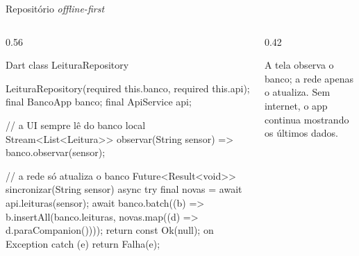 \documentclass[aspectratio=169,10pt]{beamer}
\begin{document}
\begin{frame}[fragile]{Repositório \emph{offline-first}}
  \begin{columns}[T]
    \begin{column}{0.56\textwidth}
\begin{codigo}[title=data/repositories/leitura\_repository.dart]{Dart}
class LeituraRepository {
  LeituraRepository({required this.banco, required this.api});
  final BancoApp banco;
  final ApiService api;

  // a UI sempre lê do banco local
  Stream<List<Leitura>> observar(String sensor) =>
      banco.observar(sensor);

  // a rede só atualiza o banco
  Future<Result<void>> sincronizar(String sensor) async {
    try {
      final novas = await api.leituras(sensor);
      await banco.batch((b) => b.insertAll(banco.leituras,
          novas.map((d) => d.paraCompanion())));
      return const Ok(null);
    } on Exception catch (e) { return Falha(e); }
  }
}
\end{codigo}
    \end{column}
    \begin{column}{0.42\textwidth}
      \centering
      \begin{conceito}
        A tela observa o banco; a rede apenas o atualiza. Sem internet, o app continua mostrando os últimos dados.
      \end{conceito}
    \end{column}
  \end{columns}
\end{frame}
\end{document}
